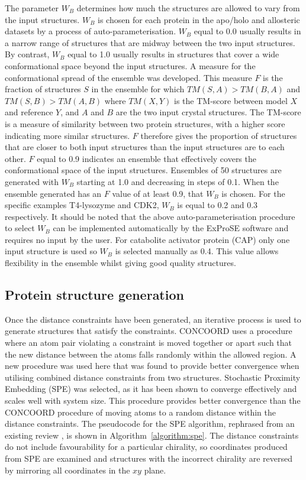 The parameter $W_{B}$ determines how much the structures are allowed to vary from the input structures.
$W_{B}$ is chosen for each protein in the apo/holo and allosteric datasets by a process of auto-parameterisation.
$W_{B}$ equal to 0.0 usually results in a narrow range of structures that are midway between the two input structures.
By contrast, $W_{B}$ equal to 1.0 usually results in structures that cover a wide conformational space beyond the input structures.
A measure for the conformational spread of the ensemble was developed.
This measure $F$ is the fraction of structures $S$ in the ensemble for which $TM(S,A) > TM(B,A)$ and $TM(S,B) > TM(A,B)$ where $TM(X,Y)$ is the TM-score between model $X$ and reference $Y$, and $A$ and $B$ are the two input crystal structures.
The TM-score is a measure of similarity between two protein structures, with a higher score indicating more similar structures.
$F$ therefore gives the proportion of structures that are closer to both input structures than the input structures are to each other.
$F$ equal to 0.9 indicates an ensemble that effectively covers the conformational space of the input structures.
Ensembles of 50 structures are generated with $W_{B}$ starting at 1.0 and decreasing in steps of 0.1.
When the ensemble generated has an $F$ value of at least 0.9, that $W_{B}$ is chosen.
For the specific examples T4-lysozyme and CDK2, $W_{B}$ is equal to 0.2 and 0.3 respectively.
It should be noted that the above auto-parameterisation procedure to select $W_{B}$ can be implemented automatically by the ExProSE software and requires no input by the user.
For catabolite activator protein (CAP) only one input structure is used so $W_{B}$ is selected manually as 0.4.
This value allows flexibility in the ensemble whilst giving good quality structures.


\subsection{Protein structure generation}

Once the distance constraints have been generated, an iterative process is used to generate structures that satisfy the constraints.
CONCOORD uses a procedure where an atom pair violating a constraint is moved together or apart such that the new distance between the atoms falls randomly within the allowed region.
A new procedure was used here that was found to provide better convergence when utilising combined distance constraints from two structures.
Stochastic Proximity Embedding (SPE) \cite{Agrafiotis2013} was selected, as it has been shown to converge effectively and scales well with system size.
This procedure provides better convergence than the CONCOORD procedure of moving atoms to a random distance within the distance constraints.
The pseudocode for the SPE algorithm, rephrased from an existing review \cite{Agrafiotis2013}, is shown in Algorithm~\ref{algorithm:spe}.
The distance constraints do not include favourability for a particular chirality, so coordinates produced from SPE are examined and structures with the incorrect chirality are reversed by mirroring all coordinates in the $xy$ plane.


